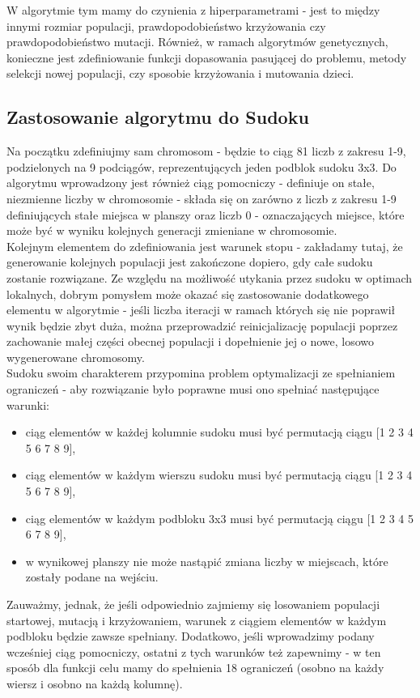 \documentclass[11pt]{scrartcl} %
\begin{document}
W algorytmie tym mamy do czynienia z hiperparametrami - jest to między innymi rozmiar populacji, prawdopodobieństwo krzyżowania czy prawdopodobieństwo mutacji. Również, w ramach algorytmów genetycznych, konieczne jest zdefiniowanie funkcji dopasowania pasującej do problemu, metody selekcji nowej populacji, czy sposobie krzyżowania i mutowania dzieci.

\subsection{Zastosowanie algorytmu do Sudoku}

Na początku zdefiniujmy sam chromosom - będzie to ciąg 81 liczb z zakresu 1-9, podzielonych na 9 podciągów, reprezentujących jeden podblok sudoku 3x3. Do algorytmu wprowadzony jest również ciąg pomocniczy - definiuje on stałe, niezmienne liczby w chromosomie - składa się on zarówno z liczb z zakresu 1-9 definiujących stałe miejsca w planszy oraz liczb 0 - oznaczających miejsce, które może być w wyniku kolejnych generacji zmieniane w chromosomie.\\

Kolejnym elementem do zdefiniowania jest warunek stopu - zakładamy tutaj, że generowanie kolejnych populacji jest zakończone dopiero, gdy całe sudoku zostanie rozwiązane. Ze względu na możliwość utykania przez sudoku w optimach lokalnych, dobrym pomysłem może okazać się zastosowanie dodatkowego elementu w algorytmie - jeśli liczba iteracji w ramach których się nie poprawił wynik będzie zbyt duża, można przeprowadzić reinicjalizację populacji poprzez zachowanie małej części obecnej populacji i dopełnienie jej o nowe, losowo wygenerowane chromosomy.\\

Sudoku swoim charakterem przypomina problem optymalizacji ze spełnianiem ograniczeń - aby rozwiązanie było poprawne musi ono spełniać następujące warunki:
\begin{itemize}
  \item ciąg elementów w każdej kolumnie sudoku musi być permutacją ciągu [1 2 3 4 5 6 7 8 9],
  \item ciąg elementów w każdym wierszu sudoku musi być permutacją ciągu [1 2 3 4 5 6 7 8 9],
  \item ciąg elementów w każdym podbloku 3x3 musi być permutacją ciągu [1 2 3 4 5 6 7 8 9],
  \item w wynikowej planszy nie może nastąpić zmiana liczby w miejscach, które zostały podane na wejściu.
\end{itemize}
Zauważmy, jednak, że jeśli odpowiednio zajmiemy się losowaniem populacji startowej, mutacją i krzyżowaniem, warunek z ciągiem elementów w każdym podbloku będzie zawsze spełniany. Dodatkowo, jeśli wprowadzimy podany wcześniej ciąg pomocniczy, ostatni z tych warunków też zapewnimy - w ten sposób dla funkcji celu mamy do spełnienia 18 ograniczeń (osobno na każdy wiersz i osobno na każdą kolumnę).\\
\end{document}
